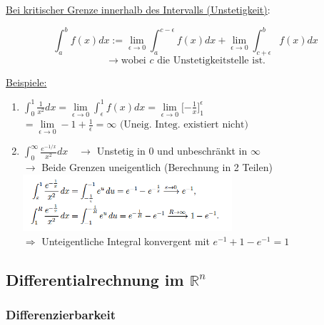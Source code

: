 \documentclass[6pt]{article}
\begin{document}
\begin{multicols*}{3}
	\vspace{5mm}
	
	\underline{Bei kritischer Grenze innerhalb des Intervalls (Unstetigkeit)}:
	
	\[
		\int_{a}^{b} f(x)  dx :=  \lim\limits_{\epsilon \to 0} \int_{a}^{c-\epsilon} f(x)  dx +  \lim\limits_{\epsilon \to 0} \int_{c+\epsilon}^{b} f(x)  dx	
	\]
	\[
		\rightarrow \text{wobei $c$ die Unstetigkeitstelle ist.}
	\]
	\vspace{2mm}
		
	\underline{Beispiele:} \vspace{-1mm}\\
	\begin{enumerate}[leftmargin=*,align=left]
		\item 	$ \int_{0}^{1} \frac{1}{x^2}  dx = \lim\limits_{\epsilon \to 0}  \int_{\epsilon}^{1}f(x) dx =  \lim\limits_{\epsilon \to 0} \lbrack-\frac{1}{x}\rbrack_{1}^{\epsilon} 		$ \\
		$ = \lim\limits_{\epsilon \to 0} -1 + \frac{1}{\epsilon} = \infty \text{  (Uneig. Integ. existiert nicht)}$
		\item $ \int_{0}^{\infty} \frac{e^{-1/x}}{x^2}  dx \quad \rightarrow$ Unstetig in 0 und unbeschr{\"a}nkt in $\infty$ \vspace{1mm}\\
			$\longrightarrow$ Beide Grenzen uneigentlich (Berechnung in 2 Teilen) \vspace{1mm}\\
				\includegraphics[width=220pt]{images/beispiel_uneigInteg}  \\
			$\Rightarrow$ Unteigentliche Integral konvergent mit $e^{-1} + 1 - e^{-1} = 1	$
	\end{enumerate}
		
	


\pagebreak
\subsection*{Differentialrechnung im $\mathbb{R}^n$}

	
	\subsubsection*{Differenzierbarkeit}
	

\end{multicols*}
\end{document}
